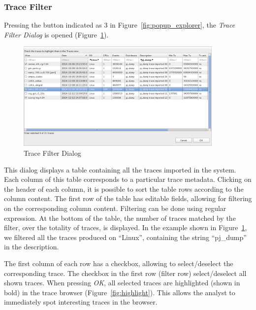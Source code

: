 \documentclass[twoside]{article}
\begin{document}
\begin{sloppypar}
\subsubsection{Trace Filter}
\label{subsubsec:trace_filter}

Pressing the button indicated as \num{3} in Figure~\ref{fig:popup_explorer}, the \emph{Trace Filter Dialog} is opened (Figure~\ref{fig:trace_filter_dialog}).

\begin{figure}[h!]
  \centering
    \includegraphics[width=0.9\textwidth]{images/trace_table_filter.png}
  \caption{Trace Filter Dialog}
  \label{fig:trace_filter_dialog}
\end{figure}

This dialog displays a table containing all the traces imported in the system. Each column of this table corresponds to a particular trace metadata. Clicking on the header of each column, it is possible to sort the table rows according to the column content. The first row of the table has editable fields, allowing for filtering on the corresponding column content. Filtering can be done using regular expression. At the bottom of the table, the number of traces matched by the filter, over the totality of traces, is displayed. In the example shown in Figure~\ref{fig:trace_filter_dialog}, we filtered all the traces produced on ``Linux'', containing the string ``pj\_dump'' in the description.

The first column of each row has a checkbox, allowing to select/deselect the corresponding trace. The checkbox in the first row (filter row) select/deselect all shown traces.
When pressing \emph{OK}, all selected traces are highlighted (shown in bold) in the trace browser (Figure~\ref{fig:highlight}). This allows the analyst to immediately spot interesting traces in the browser.


\end{sloppypar}
\end{document}
